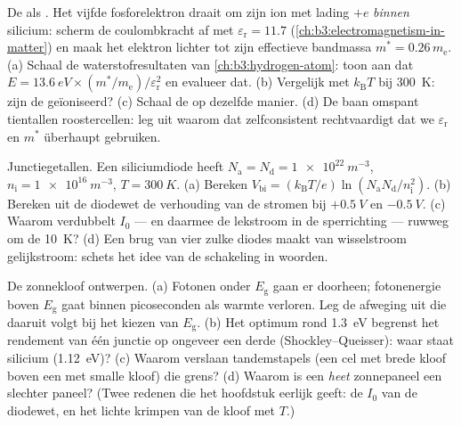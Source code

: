 \begin{exercise}[$\star\star\star$]\label{exo:b3:electrons-in-solids:10}
De  als . Het vijfde fosforelektron
draait om zijn ion met lading $+e$ \emph{binnen} silicium: scherm de coulombkracht af met
$\varepsilon_{\text{r}} = 11.7$
(\cref{ch:b3:electromagnetism-in-matter}) en maak het elektron lichter
tot zijn effectieve bandmassa $m^* = 0.26\,m_{\text{e}}$.
(a) Schaal de waterstofresultaten van \cref{ch:b3:hydrogen-atom}:
toon aan dat $E = \qty{13.6}{eV}\times(m^*/m_{\text{e}})/
\varepsilon_{\text{r}}^2$ en evalueer dat. (b) Vergelijk met
$k_{\text{B}}T$ bij \qty{300}{K}: zijn de  geïoniseerd? (c) Schaal
de  op dezelfde manier. (d) De baan omspant tientallen
roostercellen: leg uit waarom dat zelfconsistent rechtvaardigt dat we
$\varepsilon_{\text{r}}$ en $m^*$ überhaupt gebruiken.
\end{exercise}

\begin{exercise}[$\star\star\star$]\label{exo:b3:electrons-in-solids:11}
Junctiegetallen. Een siliciumdiode heeft $N_{\text{a}} =
N_{\text{d}} = \qty{1e22}{m^{-3}}$, $n_{\text{i}} =
\qty{1e16}{m^{-3}}$, $T = \qty{300}{K}$. (a) Bereken
$V_{\text{bi}} = (k_{\text{B}}T/e)\ln(N_{\text{a}}N_{\text{d}}/
n_{\text{i}}^2)$. (b) Bereken uit de diodewet de verhouding van de
stromen bij $+\qty{0.5}{V}$ en $-\qty{0.5}{V}$. (c) Waarom verdubbelt
$I_0$ --- en daarmee de lekstroom in de sperrichting --- ruwweg om de
\qty{10}{K}? (d) Een brug van vier zulke diodes maakt van wisselstroom gelijkstroom:
schets het idee van de schakeling in woorden.
\end{exercise}

\begin{exercise}[$\star\star\star$]\label{exo:b3:electrons-in-solids:12}
De zonnekloof ontwerpen. (a) Fotonen onder $E_{\text{g}}$ gaan er
doorheen; fotonenergie boven $E_{\text{g}}$ gaat binnen picoseconden als warmte
verloren. Leg de afweging uit die daaruit volgt bij het kiezen van
$E_{\text{g}}$. (b) Het optimum rond \qty{1.3}{eV} begrenst het
rendement van één junctie op ongeveer een derde
(Shockley--Queisser): waar staat silicium
(\qty{1.12}{eV})? (c) Waarom verslaan tandemstapels (een cel met brede kloof
boven een met smalle kloof) die grens? (d) Waarom is een
\emph{heet} zonnepaneel een slechter paneel? (Twee redenen die het hoofdstuk eerlijk geeft:
de $I_0$ van de diodewet, en het lichte krimpen van de kloof met $T$.)
\end{exercise}

